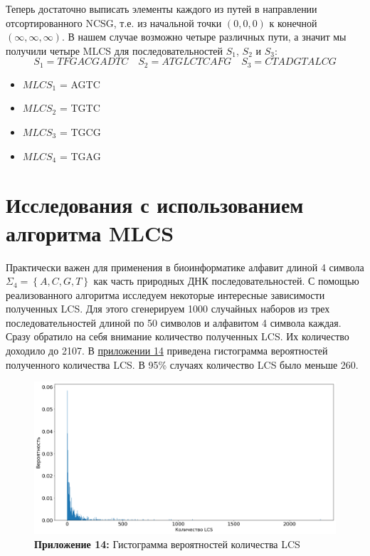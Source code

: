 \documentclass[a4paper,12pt]{extarticle}
\begin{document}
Теперь достаточно выписать элементы каждого из путей в направлении отсортированного NCSG, т.е. из начальной точки $(0, 0, 0)$ к конечной $(\infty, \infty, \infty)$. В нашем случае возможно четыре различных пути, а значит мы получили четыре MLCS для последовательностей $S_{1}$, $S_{2}$ и $S_{3}$:
\[S_{1} = TFGACGADTC \quad S_{2} = ATGLCTCAFG \quad S_{3} = CTADGTALCG\]
\begin{multicols}{2}
  \begin{itemize}[leftmargin=-0cm]
          \centering
    \item $MLCS_{1}$ = AGTC \item $MLCS_{2}$ = TGTC
    \item $MLCS_{3}$ = TGCG \item $MLCS_{4}$ = TGAG
  \end{itemize}
\end{multicols}

\section{Исследования с использованием алгоритма MLCS}

Практически важен для применения в биоинформатике алфавит длиной 4 символа $\Sigma_{4} = \left\{A, C, G, T\right\}$ как часть природных ДНК последовательностей. С помощью реализованного алгоритма исследуем некоторые интересные зависимости полученных LCS. Для этого сгенерируем 1000 случайных наборов из трех последовательностей длиной по 50 символов и алфавитом 4 символа каждая. Сразу обратило на себя внимание количество полученных LCS. Их количество доходило до 2107. В \hyperref[diog:1]{приложении 14} приведена гистограмма вероятностей полученного количества LCS. В 95\% случаях количество LCS было меньше 260.

\begin{figure}[h!]
  \caption*{\textbf{Приложение 14: }Гистограмма вероятностей количества LCS}
  \label{diog:1}
  \includegraphics[width=1\textwidth]{Diogram_1.png}
\end{figure}
\end{document}
